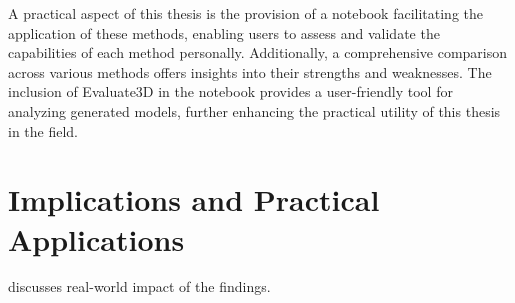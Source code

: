 A practical aspect of this thesis is the provision of a notebook facilitating the application of these methods, enabling users to assess and validate the capabilities of each method personally. Additionally, a comprehensive comparison across various methods offers insights into their strengths and weaknesses. The inclusion of Evaluate3D in the notebook provides a user-friendly tool for analyzing generated models, further enhancing the practical utility of this thesis in the field.

\section{Implications and Practical Applications}
discusses real-world impact of the findings.